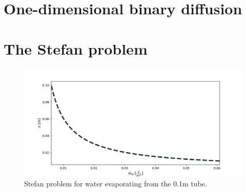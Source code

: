 \documentclass[10pt]{article}
\begin{document}
\newpage

\section{One-dimensional binary diffusion}



\newpage

\section{The Stefan problem}

\begin{figure}[H]
\centering\includegraphics[width=16cm]{Code/stefan-problem.png}
\caption{Stefan problem for water evaporating from the 0.1m tube.}
\label{fig:stefan-problem}
\end{figure}
\end{document}
